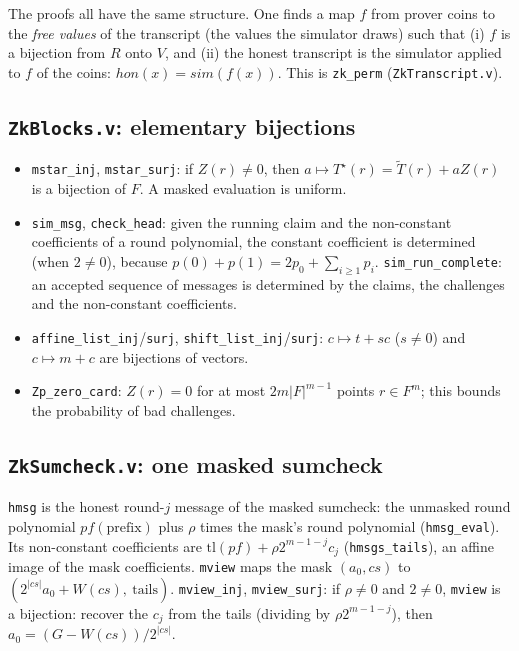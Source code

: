 \documentclass[11pt,a4paper]{article}
\newcommand{\mle}[1]{\widetilde{#1}}
\newcommand{\msk}[1]{#1^{\star}}
\theoremstyle{definition}
\theoremstyle{plain}
\begin{document}
The proofs all have the same structure. One finds a map $f$ from prover coins to the \emph{free
values} of the transcript (the values the simulator draws) such that
(i) $f$ is a bijection from $R$ onto $V$, and (ii) the honest transcript is the simulator applied to
$f$ of the coins: $\mathit{hon}(x)=\mathit{sim}(f(x))$. This is \texttt{zk\_perm}
(\texttt{ZkTranscript.v}).

\subsection{\texttt{ZkBlocks.v}: elementary bijections}

\begin{itemize}[leftmargin=1.3em]
\item \texttt{mstar\_inj}, \texttt{mstar\_surj}: if $Z(r)\ne0$, then $a\mapsto\msk T(r)=\mle T(r)+aZ(r)$ is a
  bijection of $F$. A masked evaluation is uniform.
\item \texttt{sim\_msg}, \texttt{check\_head}: given the running claim and the non-constant coefficients of
  a round polynomial, the constant coefficient is determined (when $2\ne0$), because
  $p(0)+p(1)=2p_0+\sum_{i\ge1}p_i$. \texttt{sim\_run\_complete}: an accepted sequence of messages is
  determined by the claims, the challenges and the non-constant coefficients.
\item \texttt{affine\_list\_inj}/\texttt{surj}, \texttt{shift\_list\_inj}/\texttt{surj}: $c\mapsto t+sc$ ($s\ne0$) and
  $c\mapsto m+c$ are bijections of vectors.
\item \texttt{Zp\_zero\_card}: $Z(r)=0$ for at most $2m|F|^{m-1}$ points $r\in F^m$; this bounds the
  probability of bad challenges.
\end{itemize}

\subsection{\texttt{ZkSumcheck.v}: one masked sumcheck}

\texttt{hmsg} is the honest round-$j$ message of the masked sumcheck: the unmasked round polynomial
$pf(\text{prefix})$ plus $\rho$ times the mask's round polynomial (\texttt{hmsg\_eval}). Its
non-constant coefficients are $\mathrm{tl}(pf)+\rho2^{m-1-j}c_j$ (\texttt{hmsgs\_tails}), an affine image
of the mask coefficients. \texttt{mview} maps the mask $(a_0,cs)$ to
$(2^{|cs|}a_0+W(cs),\ \text{tails})$.
\texttt{mview\_inj}, \texttt{mview\_surj}: if $\rho\ne0$ and $2\ne0$, \texttt{mview} is a bijection: recover
the $c_j$ from the tails (dividing by $\rho2^{m-1-j}$), then $a_0=(G-W(cs))/2^{|cs|}$.
\end{document}
